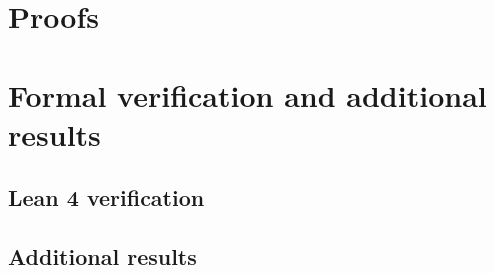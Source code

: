 \documentclass[11pt]{article}
\theoremstyle{definition}
\theoremstyle{remark}
\begin{document}



\appendix
\section{Proofs}\label{app:proofs}


\section{Formal verification and additional results}
\subsection{Lean 4 verification}\label{app:lean}


\subsection{Additional results}\label{app:figs}



\end{document}
